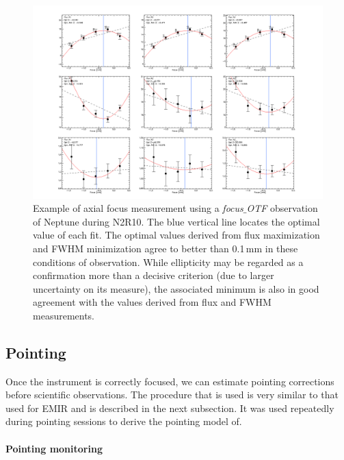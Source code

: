 \begin{figure}[hhh]
\begin{center}
  \includegraphics[clip, angle=0, scale=0.25]{Figures/plot_20170419s143.png}
\caption[Axial focus measure]{Example of axial focus measurement using a
  \emph{focus$\_$OTF} observation of Neptune during N2R10. The blue vertical line
  locates the optimal value of each fit. The optimal values derived from flux
  maximization and FWHM minimization agree to better than 0.1\,mm in these
  conditions of observation. While ellipticity may be regarded as a confirmation
  more than a decisive criterion (due to larger uncertainty on its measure), the
  associated minimum is also in good agreement with the values derived from flux
  and FWHM measurements.}
\label{fig:focus-example}
\end{center}
\end{figure}


\subsection{Pointing}
\label{se:pointing}

Once the instrument is correctly focused, we can estimate pointing corrections
before scientific observations. The procedure that is used is very similar to
that used for EMIR and is described in the next subsection. It was used
repeatedly during pointing sessions to derive the pointing model of.

\paragraph{Pointing monitoring}

